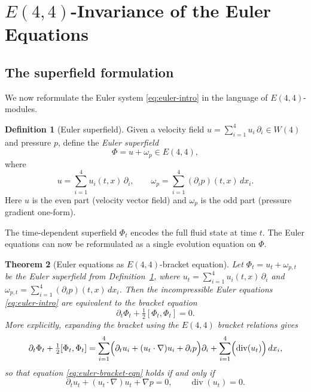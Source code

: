 \documentclass[reqno,10pt]{amsart}
\theoremstyle{plain}
\newtheorem{theorem}{Theorem}[section]
\theoremstyle{definition}
\newtheorem{definition}[theorem]{Definition}
\def\gE{E(4,4)}
\def\div{\operatorname{div}}
\begin{document}
\section{$E(4,4)$-Invariance of the Euler Equations}

\subsection{The superfield formulation}

We now reformulate the Euler system \eqref{eq:euler-intro} in the language of $\gE$-modules.

\begin{definition}[Euler superfield]\label{def:euler-superfield}
Given a velocity field $u = \sum_{i=1}^4 u_i\,\partial_i\in W(4)$ and pressure $p$, define the \emph{Euler superfield}
\[
  \Phi = u + \omega_p \in \gE,
\]
where
\[
  u = \sum_{i=1}^4 u_i(t,x)\,\partial_i, \qquad \omega_p = \sum_{i=1}^4 (\partial_i p)(t,x)\,dx_i.
\]
Here $u$ is the even part (velocity vector field) and $\omega_p$ is the odd part (pressure gradient one-form).
\end{definition}

The time-dependent superfield $\Phi_t$ encodes the full fluid state at time $t$. The Euler equations can now be reformulated as a single evolution equation on $\Phi$.

\begin{theorem}[Euler equations as $\gE$-bracket equation]\label{thm:euler-bracket}
Let $\Phi_t = u_t + \omega_{p,t}$ be the Euler superfield from Definition~\ref{def:euler-superfield}, where $u_t = \sum_{i=1}^4 u_i(t,x)\,\partial_i$ and $\omega_{p,t} = \sum_{i=1}^4 (\partial_i p)(t,x)\,dx_i$. Then the incompressible Euler equations \eqref{eq:euler-intro} are equivalent to the bracket equation
\begin{equation}\label{eq:euler-bracket-eqn}
  \partial_t\Phi_t + \tfrac{1}{2}[\Phi_t,\Phi_t] = 0.
\end{equation}
More explicitly, expanding the bracket using the $\gE$ bracket relations gives
\begin{equation}\label{eq:bracket-expansion}
  \partial_t\Phi_t + \tfrac{1}{2}[\Phi_t,\Phi_t]
  = \sum_{i=1}^4 \Bigl(\partial_t u_i + (u_t\cdot\nabla)u_i + \partial_i p\Bigr)\partial_i
    + \sum_{i=1}^4 \Bigl(\div(u_t)\Bigr)\,dx_i,
\end{equation}
so that equation \eqref{eq:euler-bracket-eqn} holds if and only if
\begin{equation}\label{eq:euler-components}
  \partial_t u_t + (u_t\cdot\nabla)u_t + \nabla p = 0, \qquad \div(u_t)=0.
\end{equation}
\end{theorem}
\end{document}
